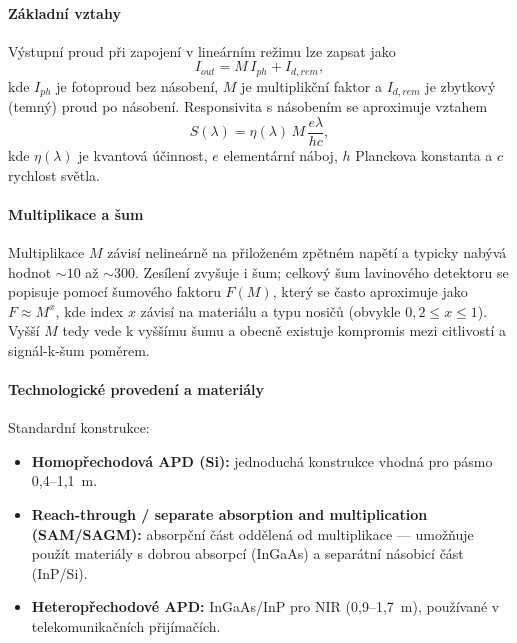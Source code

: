 \documentclass[a4paper, 12pt]{article}
\begin{document}
        \paragraph{Základní vztahy}
        Výstupní proud při zapojení v lineárním režimu lze zapsat jako
        \begin{equation}
            I_{out} = M\,I_{ph} + I_{d,rem},
        \end{equation}
        kde $I_{ph}$ je fotoproud bez násobení, $M$ je multiplikční faktor a $I_{d,rem}$ je zbytkový (temný)
        proud po násobení. Responsivita s násobením se aproximuje vztahem
        \begin{equation}
            S(\lambda)=\eta(\lambda)\,M\,\frac{e\lambda}{hc},
        \end{equation}
        kde $\eta(\lambda)$ je kvantová účinnost, $e$ elementární náboj, $h$ Planckova konstanta a $c$
        rychlost světla.

        \paragraph{Multiplikace a šum}
        Multiplikace $M$ závisí nelineárně na přiloženém zpětném napětí a typicky nabývá hodnot $\sim 10$ až $\sim300$.
        Zesílení zvyšuje i šum; celkový šum lavinového detektoru se popisuje pomocí šumového faktoru $F(M)$,
        který se často aproximuje jako $F\approx M^{x}$, kde index $x$ závisí na materiálu a typu nosičů (obvykle
        $0{,}2\le x \le 1$). Vyšší $M$ tedy vede k vyššímu šumu a obecně existuje kompromis mezi citlivostí a
        signál-k-šum poměrem.

        \paragraph{Technologické provedení a materiály}
        Standardní konstrukce:
        \begin{itemize}
            \item \textbf{Homopřechodová APD (Si):} jednoduchá konstrukce vhodná pro pásmo 0{,}4--1{,}1~\textmu m.
            \item \textbf{Reach-through / separate absorption and multiplication (SAM/SAGM):} absorpční část oddělená
            od multiplikace — umožňuje použít materiály s dobrou absorpcí (InGaAs) a separátní násobicí část (InP/Si).
            \item \textbf{Heteropřechodové APD:} InGaAs/InP pro NIR (0{,}9--1{,}7~\textmu m), používané v telekomunikačních přijímačích.
        \end{itemize}
\end{document}
